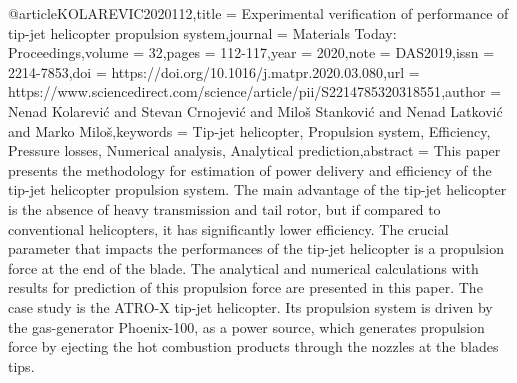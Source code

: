 @article{KOLAREVIC2020112,title = {Experimental verification of performance of tip-jet helicopter propulsion system},journal = {Materials Today: Proceedings},volume = {32},pages = {112-117},year = {2020},note = {DAS2019},issn = {2214-7853},doi = {https://doi.org/10.1016/j.matpr.2020.03.080},url = {https://www.sciencedirect.com/science/article/pii/S2214785320318551},author = {Nenad Kolarević and Stevan Crnojević and Miloš Stanković and Nenad Latković and Marko Miloš},keywords = {Tip-jet helicopter, Propulsion system, Efficiency, Pressure losses, Numerical analysis, Analytical prediction},abstract = {This paper presents the methodology for estimation of power delivery and efficiency of the tip-jet helicopter propulsion system. The main advantage of the tip-jet helicopter is the absence of heavy transmission and tail rotor, but if compared to conventional helicopters, it has significantly lower efficiency. The crucial parameter that impacts the performances of the tip-jet helicopter is a propulsion force at the end of the blade. The analytical and numerical calculations with results for prediction of this propulsion force are presented in this paper. The case study is the ATRO-X tip-jet helicopter. Its propulsion system is driven by the gas-generator Phoenix-100, as a power source, which generates propulsion force by ejecting the hot combustion products through the nozzles at the blades tips.}}